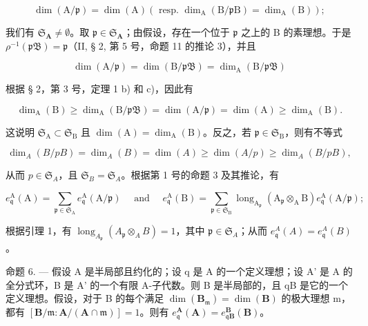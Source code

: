 \[
\dim (\mathrm{A} / \mathfrak {p}) = \dim (\mathrm{A}) (\text { resp. } \dim_ {\mathrm{A}} (\mathrm{B} / \mathfrak {p} \mathrm{B}) = \dim_ {\mathrm{A}} (\mathrm{B}));
\]

我们有 \(\mathfrak{S}_{\mathbf{A}} \neq \emptyset\)。取 \(\mathfrak{p} \in \mathfrak{S}_{\mathbf{A}}\)；由假设，存在一个位于 \(\mathfrak{p}\) 之上的 B 的素理想。于是 \(\rho^{-1}(\mathfrak{pB}) = \mathfrak{p}\)（II, § 2, 第 5 号，命题 11 的推论 3），并且

\[
\dim (\mathrm{A} / \mathfrak {p}) = \dim (\mathrm{B} / \mathfrak {p B}) = \dim_ {\mathrm{A}} (\mathrm{B} / \mathfrak {p B})
\]

根据 § 2，第 3 号，定理 1 b) 和 c)，因此有

\[
\dim_ {\mathrm{A}} (\mathrm{B}) \geqslant \dim_ {\mathrm{A}} (\mathrm{B} / \mathfrak {p B}) = \dim (\mathrm{A} / \mathfrak {p}) = \dim (\mathrm{A}) \geqslant \dim_ {\mathrm{A}} (\mathrm{B}).
\]

这说明 \(\mathfrak{S}_{\mathrm{A}} \subset \mathfrak{S}_{\mathrm{B}}\) 且 \(\dim(\mathrm{A}) = \dim_{\mathrm{A}}(\mathrm{B})\)。反之，若 \(\mathfrak{p} \in \mathfrak{S}_{\mathrm{B}}\)，则有不等式

\[
\dim_ {A} (B / p B) = \dim_ {A} (B) = \dim (A) \geqslant \dim (A / p) \geqslant \dim_ {A} (B / p B),
\]

从而 \(p \in \mathfrak{S}_A\)，且 \(\mathfrak{S}_B = \mathfrak{S}_A\)。根据第 1 号的命题 3 及其推论，有

\[
e _ {\mathfrak {q}} ^ {\mathrm{A}} (\mathrm{A}) = \sum_ {\mathfrak {p} \in \mathfrak {S} _ {\mathrm{A}}} e _ {\mathfrak {q}} ^ {\mathrm{A}} (\mathrm{A} / \mathfrak {p}) \quad \text { and } \quad e _ {\mathfrak {q}} ^ {\mathrm{A}} (\mathrm{B}) = \sum_ {\mathfrak {p} \in \mathfrak {S} _ {\mathrm{B}}} \operatorname{long} _ {\mathrm{A} _ {\mathfrak {p}}} (\mathrm{A} _ {\mathfrak {p}} \otimes_ {\mathrm{A}} \mathrm{B}) e _ {\mathfrak {q}} ^ {\mathrm{A}} (\mathrm{A} / \mathfrak {p});
\]

根据引理 1，有 \(\operatorname{long}_{A_{\mathfrak{p}}}(A_{\mathfrak{p}} \otimes_{A} B) = 1\)，其中 \(\mathfrak{p} \in \mathfrak{S}_{A}\)；从而 \(e_{\mathfrak{q}}^{A}(A) = e_{\mathfrak{q}}^{A}(B)\)。

命题 6. --- 假设 A 是半局部且约化的；设 q 是 A 的一个定义理想；设 A' 是 A 的全分式环，B 是 A' 的一个有限 A-子代数。则 B 是半局部的，且 qB 是它的一个定义理想。假设，对于 B 的每个满足 \(\dim(\mathbf{B}_{\mathfrak{m}})=\dim(\mathbf{B})\) 的极大理想 m，都有 \([\mathbf{B}/\mathfrak{m}:\mathbf{A}/(\mathbf{A}\cap\mathfrak{m})]=1\)。则有 \(e_{\mathfrak{q}}^{\mathbf{A}}(\mathbf{A})=e_{\mathfrak{q}\mathbf{B}}^{\mathbf{B}}(\mathbf{B})\)。

